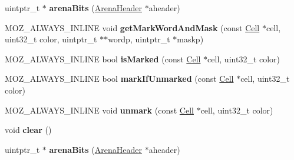 \begin{DoxyCompactItemize}
\item 
\hypertarget{structjs_1_1gc_1_1_chunk_bitmap_a28a8d36060797da1a5a93223de366ee3}{uintptr\-\_\-t $\ast$ {\bfseries arena\-Bits} (\hyperlink{structjs_1_1gc_1_1_arena_header}{Arena\-Header} $\ast$aheader)}\label{structjs_1_1gc_1_1_chunk_bitmap_a28a8d36060797da1a5a93223de366ee3}

\item 
\hypertarget{structjs_1_1gc_1_1_chunk_bitmap_ad72514f5cc7f818fdb4e28cb827a8354}{M\-O\-Z\-\_\-\-A\-L\-W\-A\-Y\-S\-\_\-\-I\-N\-L\-I\-N\-E void {\bfseries get\-Mark\-Word\-And\-Mask} (const \hyperlink{structjs_1_1gc_1_1_cell}{Cell} $\ast$cell, uint32\-\_\-t color, uintptr\-\_\-t $\ast$$\ast$wordp, uintptr\-\_\-t $\ast$maskp)}\label{structjs_1_1gc_1_1_chunk_bitmap_ad72514f5cc7f818fdb4e28cb827a8354}

\item 
\hypertarget{structjs_1_1gc_1_1_chunk_bitmap_ab5a23317938c325c7c59e111ce2e60f7}{M\-O\-Z\-\_\-\-A\-L\-W\-A\-Y\-S\-\_\-\-I\-N\-L\-I\-N\-E bool {\bfseries is\-Marked} (const \hyperlink{structjs_1_1gc_1_1_cell}{Cell} $\ast$cell, uint32\-\_\-t color)}\label{structjs_1_1gc_1_1_chunk_bitmap_ab5a23317938c325c7c59e111ce2e60f7}

\item 
\hypertarget{structjs_1_1gc_1_1_chunk_bitmap_a2b2bbf13bb8ad1a35e5c9143c04bd125}{M\-O\-Z\-\_\-\-A\-L\-W\-A\-Y\-S\-\_\-\-I\-N\-L\-I\-N\-E bool {\bfseries mark\-If\-Unmarked} (const \hyperlink{structjs_1_1gc_1_1_cell}{Cell} $\ast$cell, uint32\-\_\-t color)}\label{structjs_1_1gc_1_1_chunk_bitmap_a2b2bbf13bb8ad1a35e5c9143c04bd125}

\item 
\hypertarget{structjs_1_1gc_1_1_chunk_bitmap_a33296aa529d653d353b6018509e9a01b}{M\-O\-Z\-\_\-\-A\-L\-W\-A\-Y\-S\-\_\-\-I\-N\-L\-I\-N\-E void {\bfseries unmark} (const \hyperlink{structjs_1_1gc_1_1_cell}{Cell} $\ast$cell, uint32\-\_\-t color)}\label{structjs_1_1gc_1_1_chunk_bitmap_a33296aa529d653d353b6018509e9a01b}

\item 
\hypertarget{structjs_1_1gc_1_1_chunk_bitmap_a609815773069ba57f6a004b16feb1e94}{void {\bfseries clear} ()}\label{structjs_1_1gc_1_1_chunk_bitmap_a609815773069ba57f6a004b16feb1e94}

\item 
\hypertarget{structjs_1_1gc_1_1_chunk_bitmap_a28a8d36060797da1a5a93223de366ee3}{uintptr\-\_\-t $\ast$ {\bfseries arena\-Bits} (\hyperlink{structjs_1_1gc_1_1_arena_header}{Arena\-Header} $\ast$aheader)}\label{structjs_1_1gc_1_1_chunk_bitmap_a28a8d36060797da1a5a93223de366ee3}

\end{DoxyCompactItemize}
